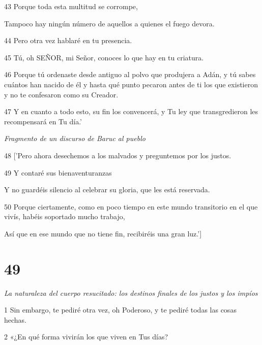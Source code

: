 \par 43 Porque toda esta multitud se corrompe,

\par Tampoco hay ningún número de aquellos a quienes el fuego devora.

\par 44 Pero otra vez hablaré en tu presencia.

\par 45 Tú, oh SEÑOR, mi Señor, conoces lo que hay en tu criatura.

\par 46 Porque tú ordenaste desde antiguo al polvo que produjera a Adán, y tú sabes cuántos han nacido de él y hasta qué punto pecaron antes de ti los que existieron y no te confesaron como su Creador.

\par 47 Y en cuanto a todo esto, su fin los convencerá, y Tu ley que transgredieron les recompensará en Tu día.'

\par \textit{Fragmento de un discurso de Baruc al pueblo}

\par 48 ['Pero ahora desechemos a los malvados y preguntemos por los justos.

\par 49 Y contaré sus bienaventuranzas

\par Y no guardéis silencio al celebrar su gloria, que les está reservada.

\par 50 Porque ciertamente, como en poco tiempo en este mundo transitorio en el que vivís, habéis soportado mucho trabajo,

\par Así que en ese mundo que no tiene fin, recibiréis una gran luz.']

\chapter{49}

\par \textit{La naturaleza del cuerpo resucitado: los destinos finales de los justos y los impíos}

\par 1 Sin embargo, te pediré otra vez, oh Poderoso, y te pediré todas las cosas hechas.

\par 2 «¿En qué forma vivirán los que viven en Tus días?

